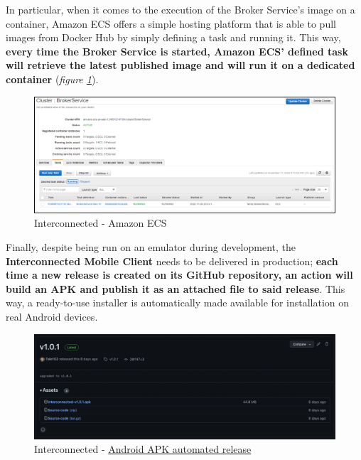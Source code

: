 In particular, when it comes to the execution of the Broker Service's image on a container, Amazon ECS offers a simple hosting platform that is able to pull images from Docker Hub by simply defining a task and running it. This way, \textbf{every time the Broker Service is started, Amazon ECS' defined task will retrieve the latest published image and will run it on a dedicated container} (\textit{figure \ref{fig:interconnected_ecs}}).

\begin{figure}[!ht]
    \centering
    \includegraphics[scale=0.37]{document/chapters/chapter_6/images/interconnected_ecs.png}
    \caption{Interconnected - Amazon ECS}
    \label{fig:interconnected_ecs}
\end{figure}

Finally, despite being run on an emulator during development, the \textbf{Interconnected Mobile Client} needs to be delivered in production; \textbf{each time a new release is created on its GitHub repository, an action will build an APK and publish it as an attached file to said release}. This way, a ready-to-use installer is automatically made available for installation on real Android devices.

\begin{figure}[!ht]
    \centering
    \includegraphics[scale=0.3]{document/chapters/chapter_6/images/github_actions_apk.png}
    \caption{Interconnected - \href{https://github.com/Interconnected-project/interconnected_mobile_client/releases}{Android APK automated release}}
    \label{fig:github_actions_apk}
\end{figure}